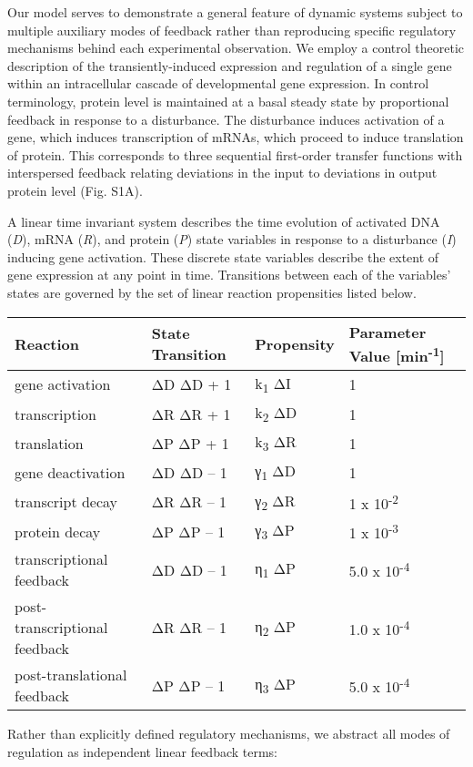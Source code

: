Our model serves to demonstrate a general feature of dynamic systems subject to multiple auxiliary modes of feedback rather than reproducing specific regulatory mechanisms behind each experimental observation. We employ a control theoretic description of the transiently-induced expression and regulation of a single gene within an intracellular cascade of developmental gene expression. In control terminology, protein level is maintained at a basal steady state by proportional feedback in response to a disturbance. The disturbance induces activation of a gene, which induces transcription of mRNAs, which proceed to induce translation of protein. This corresponds to three sequential first-order transfer functions with interspersed feedback relating deviations in the input to deviations in output protein level (Fig. S1A).

A linear time invariant system describes the time evolution of activated DNA (\emph{D}), mRNA (\emph{R}), and protein (\emph{P}) state variables in response to a disturbance (\emph{I}) inducing gene activation. These discrete state variables describe the extent of gene expression at any point in time. Transitions between each of the variables' states are governed by the set of linear reaction propensities listed below.

\begin{longtable}[]{@{}llll@{}}
\toprule
\textbf{Reaction} & \textbf{State Transition} & \textbf{Propensity} & \textbf{Parameter Value {[}min\textsuperscript{-1}{]}}\tabularnewline
\midrule
\endhead
gene activation & ΔD ΔD + 1 & k\textsubscript{1} ΔI & 1\tabularnewline
transcription & ΔR ΔR + 1 & k\textsubscript{2} ΔD & 1\tabularnewline
translation & ΔP ΔP + 1 & k\textsubscript{3} ΔR & 1\tabularnewline
gene deactivation & ΔD ΔD -- 1 & γ\textsubscript{1} ΔD & 1\tabularnewline
transcript decay & ΔR ΔR -- 1 & γ\textsubscript{2} ΔR & 1 x 10\textsuperscript{-2}\tabularnewline
protein decay & ΔP ΔP -- 1 & γ\textsubscript{3} ΔP & 1 x 10\textsuperscript{-3}\tabularnewline
transcriptional feedback & ΔD ΔD -- 1 & η\textsubscript{1} ΔP & 5.0 x 10\textsuperscript{-4}\tabularnewline
post-transcriptional feedback & ΔR ΔR -- 1 & η\textsubscript{2} ΔP & 1.0 x 10\textsuperscript{-4}\tabularnewline
post-translational feedback & ΔP ΔP -- 1 & η\textsubscript{3} ΔP & 5.0 x 10\textsuperscript{-4}\tabularnewline
\bottomrule
\end{longtable}

Rather than explicitly defined regulatory mechanisms, we abstract all modes of regulation as independent linear feedback terms:

